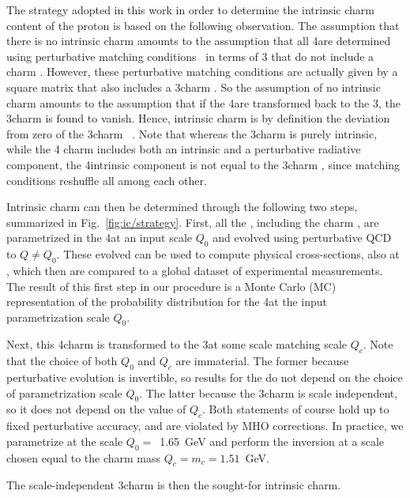 
The strategy adopted in this work in order to
determine the intrinsic charm content of the proton is 
based on the following
observation.
%
The assumption that there is no intrinsic charm
amounts to the assumption
that all 4\fns \pdfs are determined~\cite{Collins:1986mp} using
perturbative matching conditions~\cite{pdfnnlo} in terms of 
3\fns \pdfs
that do not include
a charm \pdf.
%
However, these perturbative matching conditions are
actually given by a square matrix that also includes a 3\fns charm
\pdf.
%
So the assumption of no intrinsic charm amounts to the assumption
that if the 4\fns \pdfs are transformed back to the 3\fns, the 3\fns charm
\pdf is found to vanish. Hence, intrinsic charm is by definition the
deviation from zero of the 3\fns charm \pdf~\cite{Ball:2015dpa}. Note
that whereas the 3\fns charm \pdf is purely intrinsic, while the 4\fns
charm \pdf includes both an intrinsic and a perturbative
 radiative component, the
4\fns intrinsic component is not equal to the 3\fns charm \pdf, since
matching conditions reshuffle all \pdfs among each other. 

Intrinsic charm can then be determined through the following two steps,
summarized in Fig.~\ref{fig:ic/strategy}. 
First, all the \pdfs, including the charm \pdf, are parametrized 
in the 4\fns at an input scale $Q_0$ and evolved 
using \nnlo perturbative QCD to   $Q \not = Q_0$.
%
These evolved \pdfs can be used to 
compute physical cross-sections, also at \nnlo, which then are
compared to a global dataset of experimental measurements.
%
The result of this first step in our procedure is 
a Monte Carlo (MC) representation
of the probability distribution for the 4\fns \pdfs at the input
parametrization scale $Q_0$.

Next, this 4\fns charm \pdf is transformed to the 3\fns at some scale matching scale
$Q_c$.
%
Note that the choice of both $Q_0$ and $Q_c$ are immaterial. The former
because perturbative evolution is invertible, so
results for the \pdfs do not depend on the choice of
parametrization scale $Q_0$. The latter because 
the 3\fns charm is scale independent, so it does not depend on the
value of $Q_c$.
Both statements of course hold up to fixed perturbative accuracy, and
are violated by MHO corrections.
%
In practice, we parametrize \pdfs at the scale
$Q_0=$~1.65~GeV and perform the inversion at a scale
chosen equal to the charm mass $Q_c=m_c=1.51$~GeV.

The scale-independent 3\fns charm \pdf is then the sought-for intrinsic
charm.

